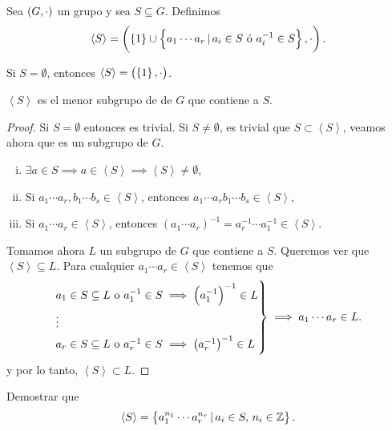 \begin{defi}
        Sea $\left( G, \cdot\right)$ un grupo y sea $S\subseteq G$. Definimos 
        \[
            \left<S\right> = \left( \left\{ 1 \right\} \cup \left\{a_1 \cdots a_r \,\vert\, a_i \in S \text{ ó } a^{-1}_i \in S\right\}, \cdot \right).
        \]
\end{defi}

\begin{obs}
    Si $S = \emptyset$, entonces $\left<S\right> = \left( \left\{1\right\}, \cdot \right)$.
\end{obs}

\begin{obs}
    $\left<S\right>$ es el menor subgrupo de de $G$ que contiene a $S$.
\end{obs}

\begin{proof}
    Si $S = \emptyset$ entonces es trivial.
    Si $S \neq \emptyset$, es trivial que $S \subset \left<S\right>$, veamos ahora que es un subgrupo de $G$.
    \begin{enumerate}[i)]
        \item $\exists a \in S \implies a \in \left<S\right> \implies \left<S\right> \neq \emptyset$,
        \item Si $a_1\cdots a_r, b_1 \cdots b_s \in \left<S\right>$, entonces $a_1 \cdots a_r b_1 \cdots b_s \in \left<S\right>$,
        \item Si $a_1 \cdots a_r \in \left<S\right>$, entonces $\left( a_1 \cdots a_r \right)^{-1} =
            a^{-1}_r \cdots a^{-1}_1 \in \left<S\right>$.
    \end{enumerate}
    Tomamos ahora $L$ un subgrupo de $G$ que contiene a $S$. Queremos ver que $\left<S\right> \subseteq L$.
    Para cualquier $a_1 \cdots a_r \in \left<S\right>$ tenemos que
    \[
        \begin{rcases}
            a_1 \in S \subseteq L \text{ o } a^{-1}_1 \in S \implies \left( a^{-1}_1 \right)^{-1} \in L\\
            \vdots \\
            a_r \in S \subseteq L\text{ o } a^{-1}_r \in S \implies \left( a^{-1}_r \right)^{-1} \in L
        \end{rcases}
        \implies a_1 \cdots a_r \in L.
    \]
    y por lo tanto, $\left<S\right> \subset L$.
\end{proof}

\begin{ej}
    Demostrar que
    \[
        \left<S\right> = \left\{a^{n_1}_1 \cdots a^{n_r}_r \,\vert\, a_i \in S, \, n_i \in \mathbb{Z}\right\}.
    \]
\end{ej}

